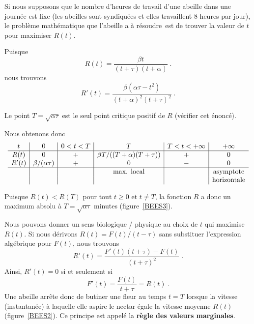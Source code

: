 {\begin{egg}[\life]
Si nous supposons que le nombre d'heures de travail d'une abeille dans une
journée est fixe (les abeilles sont syndiquées et elles travaillent
$8$ heures par jour), le problème mathémati\-que que l'abeille a \lgm
à résoudre\rgm\ est de trouver la valeur de $t$ pour maximiser
$R(t)$.

Puisque
\[
R(t) = \frac{\beta t}{(t+\tau)(t+\alpha)} \; .
\]
nous trouvons
\[
R'(t) = \frac{\beta(\alpha \tau - t^2)}{(t+\alpha)^2(t+\tau)^2} \; .
\]

Le point $T=\sqrt{\alpha\tau}$ est le seul point critique positif de
$R$ (vérifier cet énoncé).

Nous obtenons donc
\[
\begin{array}{c|c|c|c|c|c}
t & 0 & 0 < t < T & T & T < t < +\infty & +\infty \\
\hline
R(t) & 0 & + & \beta T/((T+\alpha)(T+\tau)) & + & 0 \\
R'(t) & \beta/(\alpha\tau) & + & 0 & - & 0 \\
\hline
 & & & \text{max. local} & & \text{asymptote} \\
 & & & & & \text{horizontale}
\end{array}
\]

Puisque $R(t)< R(T)$ pour tout $t \geq 0$ et $t\neq T$, la fonction $R$ a
donc un maximum absolu à $T= \sqrt{\alpha \tau}$ minutes
(figure~\ref{BEES3}).


Nous pouvons donner un sens biologique / physique au choix de $t$ qui
maximise $R(t)$.  Si nous dérivons $R(t) = F(t)/(t-\tau)$ sans substituer
l'expression algébrique pour $F(t)$, nous trouvons
\[
R'(t) = \frac{F'(t) (t+\tau) - F(t)}{(t+\tau)^2} \; .
\]
Ainsi, $R'(t)=0$ si et seulement si
\[
F'(t) = \frac{F(t)}{t+\tau} = R(t) \; .
\]
Une abeille arrête donc de butiner une fleur au temps $t=T$ lorsque la
vitesse (instantanée) à laquelle elle aspire le nectar égale la
vitesse moyenne $R(t)$ (figure~\ref{BEES2}).  Ce principe est appelé la
{\bfseries règle des valeurs marginales}. 



\end{egg}}
